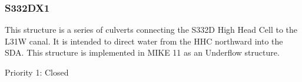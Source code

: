 %
%


\clearpage

\subsubsection{S332DX1}
This structure is a series of culverts connecting the S332D High Head Cell to the L31W canal. It is intended to direct water from the HHC northward into the SDA. This structure is implemented in MIKE 11 as an Underflow structure.

\begin{packed_items}
\item Priority 1: Closed
\end{packed_items}

